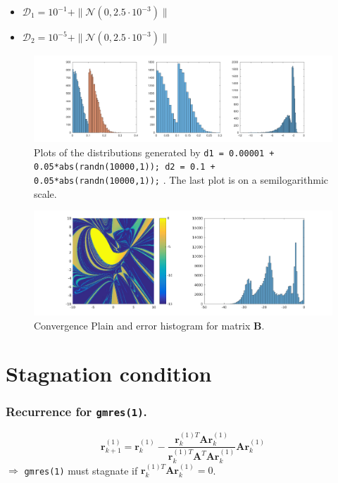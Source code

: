 \begin{frame}
\begin{itemize}
\item  $\mathcal{D}_1 = 10^{-1} + \| \mathcal{N}(0,2.5 \cdot 10^{-3}) \| $ \\
\item  $\mathcal{D}_2 = 10^{-5} + \| \mathcal{N}(0,2.5 \cdot 10^{-3}) \| $ \\
\end{itemize}

\begin{figure}
\centering
\includegraphics[width=1\linewidth]{../images/randnHist}
\caption{Plots of the distributions generated by
\texttt{d1 = 0.00001 + 0.05*abs(randn(10000,1));
d2 = 0.1 + 0.05*abs(randn(10000,1));} . The last plot is on a semilogarithmic scale. }
\end{figure}
\end{frame}

\begin{frame}
\begin{figure}
\centering
\includegraphics[width=1\linewidth]{../images/gmresBHist}
\caption{Convergence Plain and error histogram for matrix $\mathbf{B}$.}
\end{figure}
\end{frame}

\section{Stagnation condition}
\begin{frame}
\centering
\frametitle{Recurrence for \texttt{gmres(1)}.}
\begin{equation}
\mathbf{r}_{k + 1}^{(1)} = \mathbf{r}_k^{(1)} - \frac{\mathbf{r}_k^{(1)T} \mathbf{A} \mathbf{r}_k^{(1)}}{\mathbf{r}_k^{(1)T} \mathbf{A}^T \mathbf{A} \mathbf{r}_k^{(1)}} \mathbf{A} \mathbf{r}_k^{(1)}
\end{equation}
$\Rightarrow$ \texttt{gmres(1)} must stagnate if $\mathbf{r}_k^{(1)T} \mathbf{A} \mathbf{r}_k^{(1)} = 0$.
\end{frame}

